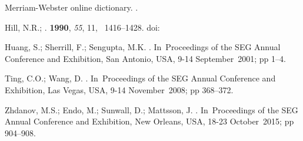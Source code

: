 \documentclass[geosciences,article,submit,moreauthors,pdftex]{Definitions/mdpi}
\begin{document}
\begin{thebibliography}{999}
Merriam-Webster online dictionary.
.


Hill, N.R.;
.
 {\bf 1990}, {\em 55}, {11}, ~1416--1428.
 doi:{\href{https://doi.org/10.1190/1.1442788}{}}

Huang, S.; Sherrill, F.; Sengupta, M.K. 
.
\newblock In~Proceedings of the SEG Annual Conference and Exhibition, San Antonio, USA, 9-14 September~2001; pp 1--4.

Ting, C.O.; Wang, D.
.
\newblock In~Proceedings of the SEG Annual Conference and Exhibition, Las Vegas, USA, 9-14 November~2008; pp 368--372.

Zhdanov, M.S.; Endo, M.; Sunwall, D.; Mattsson, J.
.
\newblock In~Proceedings of the SEG Annual Conference and Exhibition, New Orleans, USA, 18-23 October~2015; pp 904--908.


\end{thebibliography}


\end{document}
